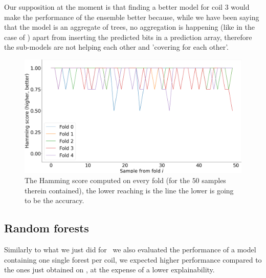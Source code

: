 Our supposition at the moment is that finding a better model for coil $3$ would make the performance of
the ensemble better because, while we have been saying that the model is an aggregate of trees, no
aggregation is happening (like in the case of \tas) apart from inserting the predicted bits in a
prediction array, therefore the sub-models are not helping each other and 'covering for each other'.

\begin{figure}[!ht]
	\centering
	\includegraphics[width=\linewidth]{img/best_dts_hs.png}
	\caption{The Hamming score computed on every fold (for the $50$ samples therein contained), the lower reaching is the line the lower is going to be the accuracy.} \label{fig:dt-qlp-hs}
\end{figure}

\subsection{Random forests}
Similarly to what we just did for \dts\ we also evaluated the performance of a model containing one
single forest per coil, we expected higher performance compared to the ones just obtained on \dts,
at the expense of a lower explainability.

